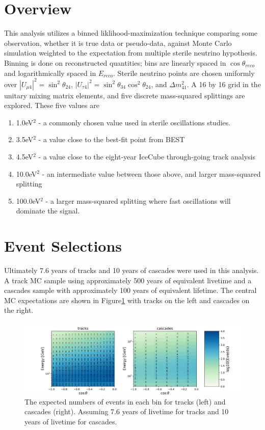 \documentclass[main.tex]{subfiles}
\begin{document}
\section{Overview}

This analysis utilizes a binned liklihood-maximization technique comparing some observation, whether it is true data or pseudo-data, against Monte Carlo simulation weighted to the expectation from multiple sterile neutrino hypothesis. 
Binning is done on reconstructed quantities; bins are linearly spaced in $\cos\theta_{reco}$ and logarithmically spaced in $E_{reco}$. 
Sterile neutrino points are chosen uniformly over $\left|U_{\mu 4}\right|^{2}=\sin^{2}\theta_{24}$, $\left|U_{\tau 4}\right|^{2}=\sin^{2}\theta_{34}\cos^{2}\theta_{24}$, and $\Delta m_{41}^{2}$. 
A 16 by 16 grid in the unitary mixing matrix elements, and five discrete mass-squared splittings are explored. 
These five values are 
\begin{enumerate}
    \item 1.0eV$^{2}$ - a commonly chosen value used in sterile oscillations studies. 
    \item 3.5eV$^{2}$ - a value close to the best-fit point from BEST~\cite{barinov2021results}
    \item 4.5eV$^{2}$ - a value close to the eight-year IceCube through-going track analysis~\cite{Aartsen_2020, Aartsen_2020_prd}
    \item 10.0eV$^{2}$ - an intermediate value between those above, and larger mass-squared splitting
    \item 100.0eV$^{2}$ - a larger mass-squared splitting where fast oscillations will dominate the signal. 
\end{enumerate}

\section{Event Selections}

Ultimately 7.6 years of tracks and 10 years of cascades were used in this analysis. 
A track MC sample using approximately 500 years of equivalent livetime and a cascades sample with approximately 100 years of equivalent lifetime. 
The central MC expectations are shown in Figure\ref{fig:event_no} with tracks on the left and cascades on the right. 

\begin{figure}
    \centering
    \includegraphics[width=0.8\linewidth]{figures/realization_joint.png}
    \caption{The expected numbers of events in each bin for tracks (left) and cascades (right). Assuming 7.6 years of livetime for tracks and 10 years of livetime for cascades.}\label{fig:event_no}
\end{figure}
\end{document}
